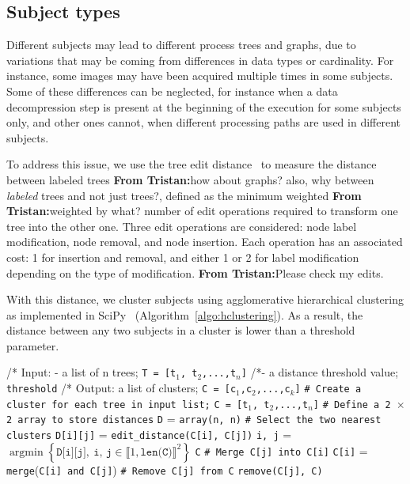 \documentclass[a4paper,num-refs]{oup-contemporary}
\DeclareMathOperator*{\argmin}{argmin}
\newcommand{\tristan}[1]{\color{blue}\textbf{From Tristan:}#1\color{black}}
\begin{document}
\subsection{Subject types}

Different subjects may lead to different process trees and graphs, due to
variations that may be coming from differences in data types or
cardinality. For instance, some images may have been acquired multiple
times in some subjects. Some of these differences can be neglected, for
instance when a data decompression step is present at the beginning of the
execution for some subjects only, and other ones cannot, when different
processing paths are used in different subjects.

To address this issue, we use the tree edit distance~\cite{zhang1989simple}
to measure the distance between labeled trees \tristan{how about graphs?
also, why between \emph{labeled} trees and not just trees?}, defined as the
minimum weighted \tristan{weighted by what?} number of edit operations
required to transform one tree into the other one. Three edit operations
are considered: node label modification, node removal, and node insertion.
Each operation has an associated cost: 1 for insertion and removal, and
either 1 or 2 for label modification depending on the type of modification. \tristan{Please check my edits.}

With this distance, we cluster subjects using agglomerative hierarchical
clustering as implemented in SciPy~\cite{oliphant2007scipy}
(Algorithm~\ref{algo:hclustering}). As a result, the distance between
any two subjects in a cluster is lower than a threshold parameter.

\begin{algorithm}[h!]
\caption{Hierarchical clustering algorithm from SciPy}
\label{algo:hclustering}
\begin{algorithmic}

  \State /* Input: - a list of n trees; \texttt{T = [t${_1}$, t${_2}$,...,t${_n}$]}
  \State /*\quad \quad \quad \quad - a distance threshold value; \texttt{threshold}
  \State /* Output: a list of clusters; \texttt{C = [c${_1}$,c${_2}$,...,c${_k}$]}
  \State \texttt{\# Create a cluster for each tree in input list;}
  \State \texttt{C = [t${_1}$, t${_2}$,...,t${_n}$]}
  \State \texttt{\# Define a 2 $\times$ 2 array to store distances}
  \State \texttt{D} = \texttt{array(n, n)}
  \State \texttt{\# Select the two nearest clusters}
  \State \texttt{D[i][j]} = \texttt{edit\_distance(C[i], C[j])}
    \EndFor
  \EndFor
  \State \texttt{i, j} = $\argmin \left\{ \texttt{D[i][j]}, \ \texttt{i, j} \in \llbracket 1, \texttt{len(C)}\rrbracket^2 \right\}$
  \State \Return \texttt{C}
  \Else
  \State \texttt{\# Merge C[j] into C[i]}
  \State \texttt{C[i]} = \texttt{merge}(\texttt{C[i] and C[j]})
  \State \texttt{\# Remove C[j] from C}
  \State \texttt{remove(C[j], C)}
  \EndIf
  \EndWhile
\end{algorithmic}
\end{algorithm}
\end{document}
